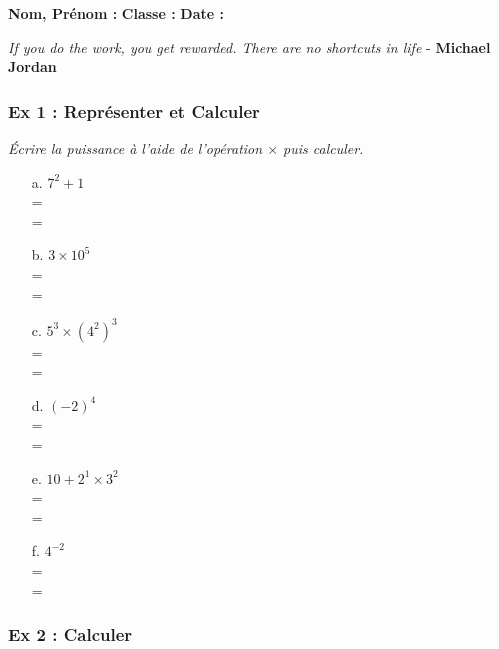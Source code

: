 



\textbf{Nom, Prénom :} \hspace{8cm} \textbf{Classe :} \hspace{3cm} \textbf{Date :}\\

\begin{center}
  \textit{If you do the work, you get rewarded. There are no shortcuts in life}  - \textbf{Michael Jordan}
\end{center}

\subsubsection*{Ex 1 : Représenter et Calculer}
\textit{Écrire la puissance à l'aide de l'opération $\times$ puis calculer.}

\begin{multicols}{3}
  \begin{itemize}
    \item[a.] $7^2 + 1 $ \\
              =  \dotfill \\
              =  \dotfill            
    \item[b.] $3 \times 10^5 $ \\
              =  \dotfill \\
              =  \dotfill      
    \item[c.] $5^3 \times (4^2)^3$ \\
              =  \dotfill \\
              =  \dotfill      
    \item[d.] $(-2)^{4}$ \\
              =  \dotfill \\
              =  \dotfill      
    \item[e.] $ 10 + 2^1 \times 3^2 $ \\
              =  \dotfill \\
              =  \dotfill      
    \item[f.] $4^{-2}$ \\
              =  \dotfill \\
              =  \dotfill      
  \end{itemize}

\end{multicols}

\subsubsection*{Ex 2 : Calculer}

